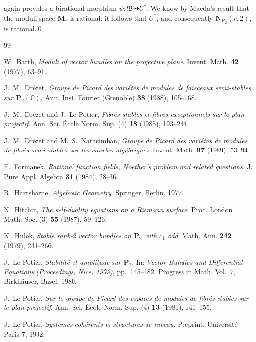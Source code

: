 \documentclass[12pt,english]{smfart}%
\theoremstyle{plain}
\theoremstyle{definition}
\theoremstyle{remark}
\newcommand{\PP}{\mathbf{P}}
\newcommand{\NN}{\mathbf{N}}           %
\newcommand{\MM}{\mathbf{M}}           %
\newcommand{\CC}{\mathbb{C}}
\newcommand{\origpage}[1]{\marginnote{\scriptsize\itshape p.~#1}}
\begin{document}
 again provides a birational morphism $\psi:\mathfrak{B}\dashrightarrow U^{*}$. We know by Maeda's result \cite{Mae} that the moduli space $\MM_r$ is rational: it follows that $U^{*}$, and consequently $\NN_{\PP_2}(r,2)$, is rational.\qed

\origpage{678}
\begin{thebibliography}{99}

 W.~Barth, \emph{Moduli of vector bundles on the projective plane}. Invent. Math. \textbf{42} (1977), 63--91.

 J.~M.~Dr\'ezet, \emph{Groupe de Picard des vari\'et\'es de modules de faisceaux semi-stables sur $\PP_{2}(\CC)$}. Ann. Inst. Fourier (Grenoble) \textbf{38} (1988), 105--168.

 J.~M.~Dr\'ezet and J.~Le Potier, \emph{Fibr\'es stables et fibr\'es exceptionnels sur le plan projectif}. Ann. Sci. \'Ecole Norm. Sup. (4) \textbf{18} (1985), 193--244.

 J.~M.~Dr\'ezet and M.~S.~Narasimhan, \emph{Groupe de Picard des vari\'et\'es de modules de fibr\'es semi-stables sur les courbes alg\'ebriques}. Invent. Math. \textbf{97} (1989), 53--94.

 E.~Formanek, \emph{Rational function fields, Noether's problem and related questions}. J. Pure Appl. Algebra \textbf{31} (1984), 28--36.

 R.~Hartshorne, \emph{Algebraic Geometry}. Springer, Berlin, 1977.

 N.~Hitchin, \emph{The self-duality equations on a Riemann surface}. Proc. London Math. Soc. (3) \textbf{55} (1987), 59--126.

 K.~Hulek, \emph{Stable rank-2 vector bundles on $\PP_{2}$ with $c_{1}$ odd}. Math. Ann. \textbf{242} (1979), 241--266.

 J.~Le Potier, \emph{Stabilit\'e et amplitude sur $\PP_{2}$}. In: \emph{Vector Bundles and Differential Equations (Proceedings, Nice, 1979)}, pp.~145--182. Progress in Math. Vol.~7, Birkh\"auser, Basel, 1980.

 J.~Le Potier, \emph{Sur le groupe de Picard des espaces de modules de fibr\'es stables sur le plan projectif}. Ann. Sci. \'Ecole Norm. Sup. (4) \textbf{13} (1981), 141--155.

 J.~Le Potier, \emph{Syst\`emes coh\'erents et structures de niveau}. Preprint, Universit\'e Paris 7, 1992.


\end{thebibliography}
\end{document}

